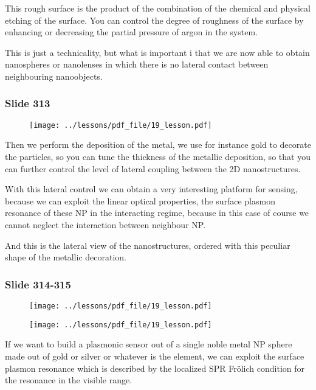 \documentclass[../main/main.tex]{subfiles}
\begin{document}
This rough surface is the product of the combination of the chemical and physical etching of the surface. You can control the degree of roughness of the surface by enhancing or decreasing the partial pressure of argon in the system. 

This is just a technicality, but what is important i that we are now able to obtain nanospheres or nanolenses in which there is no lateral contact between neighbouring nanoobjects. 

\newpage

\subsubsection{Slide 313}

\begin{figure}[h!]
\centering
\texttt{[image: ../lessons/pdf\_file/19\_lesson.pdf]}
\end{figure}

Then we perform the deposition of the metal, we use for instance gold to decorate the particles, so you can tune the thickness of the metallic deposition, so that you can further control the level of lateral coupling between the 2D nanostructures.

With this lateral control we can obtain a very interesting platform for sensing, because we can exploit the linear optical properties, the surface plasmon resonance of these NP in the interacting regime, because in this case of course we cannot neglect the interaction between neighbour NP.

And this is the lateral view of the nanostructures, ordered with this peculiar shape of the metallic decoration.

\newpage

\subsubsection{Slide 314-315}

\begin{figure}[h!]
\centering
\texttt{[image: ../lessons/pdf\_file/19\_lesson.pdf]}
\end{figure}

\begin{figure}[h!]
\centering
\texttt{[image: ../lessons/pdf\_file/19\_lesson.pdf]}
\end{figure}

If we want to build a plasmonic sensor out of a single noble metal NP sphere made out of gold or silver or whatever is the element, we can exploit the surface plasmon resonance which is described by the localized SPR Fr\"olich condition for the resonance in the visible range.
\end{document}
